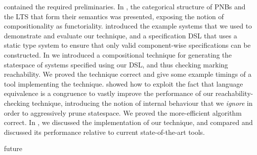  contained the required preliminaries. In
, the categorical structure of PNBs and the LTS that
form their semantics was presented, exposing the notion of compositionality as
functoriality.  introduced the example systems
that we used to demonstrate and evaluate our technique, and a specification DSL
that uses a static type system to ensure that only valid component-wise
specifications can be constructed. In  we introduced a
compositional technique for generating the statespace of systems specified
using our DSL, and thus checking marking reachability. We proved the technique
correct and give some example timings of a tool implementing the technique.
 showed how to exploit the fact that language
equivalence is a congruence to vastly improve the performance of our
reachability-checking technique, introducing the notion of internal behaviour
that we \emph{ignore} in order to aggressively prune statespace. We proved the
more-efficient algorithm correct. In , we
discussed the implementation of our technique, and compared and discussed its
performance relative to current state-of-the-art tools.

{future}
